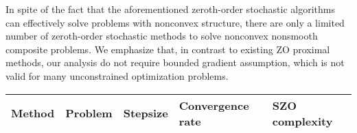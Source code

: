 In spite of the fact that the aforementioned zeroth-order stochastic algorithms can effectively solve problems with nonconvex structure, there are only a limited number of zeroth-order stochastic methods to solve nonconvex nonsmooth composite problems. We emphasize that, in contrast to existing ZO proximal methods, our analysis do not require bounded gradient assumption, which is not valid for many unconstrained optimization problems. 
\iffalse
It should be highlighted that computing full-gradient may not be effective for large-scale machine learning problems. Thus, we focus on studying a more general framework for ZO-ProxSVRG with different gradient estimators.
\fi
\begin{table*}[t]
\begin{center}
\begin{tabular}{ |l|l|l|l|l| } 
 \hline
 Method & Problem & Stepsize& Convergence rate & SZO complexity\\ 
 \hline
  

\end{tabular}
\end{center}
\end{table*}
